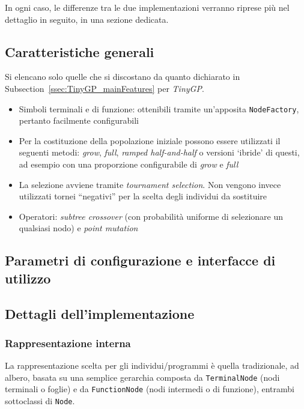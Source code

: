 \documentclass{../llncs}
\newcommand{\xss}[1]{\subsectionname~\ref{ssec:#1}}
\newcommand{\subsectionname}{Subsection}
\begin{document}
In ogni caso, le differenze tra le due implementazioni verranno riprese più nel dettaglio in seguito, in una sezione dedicata.

\subsection{Caratteristiche generali}
Si elencano solo quelle che si discostano da quanto dichiarato in \xss{TinyGP_mainFeatures} per \emph{TinyGP}.
\begin{itemize}
\item Simboli terminali e di funzione: ottenibili tramite un'apposita \texttt{NodeFactory}, pertanto facilmente configurabili
\item Per la costituzione della popolazione iniziale possono essere utilizzati il seguenti metodi: \emph{grow}, \emph{full}, \emph{ramped half-and-half} o versioni `ibride' di questi, ad esempio con una proporzione configurabile di \emph{grow} e \emph{full}
\item La selezione avviene tramite \emph{tournament selection}. Non vengono invece utilizzati tornei ``negativi'' per la scelta degli individui da sostituire

\item Operatori: \emph{subtree crossover} (con probabilità uniforme di selezionare un qualsiasi nodo) e \emph{point mutation}
\end{itemize}

\subsection{Parametri di configurazione e interfacce di utilizzo}

\subsection{Dettagli dell'implementazione}
\subsubsection{Rappresentazione interna}
La rappresentazione scelta per gli individui/programmi è quella tradizionale, ad albero, basata su una semplice gerarchia composta da \texttt{TerminalNode} (nodi terminali o foglie) e da \texttt{FunctionNode} (nodi intermedi o di funzione), entrambi sottoclassi di \texttt{Node}.
\end{document}
